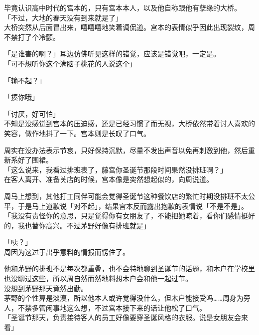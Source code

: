 毕竟认识高中时代的宫本的，只有宫本本人，以及他自称跟他有孽缘的大桥。\\

「不过，大地的春天没有到来就是了」\\

大桥突然从后面冒出来，嘻嘻嘻地笑着调侃道。宫本的表情似乎因此出现裂纹，周不禁打了个冷颤。

「是谁害的啊？」耳边仿佛听见这样的错觉，应该是错觉吧，一定是。\\

「可不想听你这个满脑子桃花的人说这个」

「输不起？」

「揍你哦」

「讨厌，好可怕」\\

不知是没感觉到宫本的压迫感，还是已经习惯了而无视，大桥依然带着讨人喜欢的笑容，做作地抖了一下。宫本则是长叹了口气。

周实在没办法表示节哀，只好保持沉默，尽量不发出声音以免再刺激到他，然后重新系好了围裙。\\

「这么说来，我看过排班表了，藤宫你圣诞节那段时间果然没排班啊？」\\

在客人离开、准备关店的时候，宫本像是突然想起似的，向周说道。

周马上想到，其他打工同伴可能会觉得圣诞节这种餐饮店的繁忙时期没排班不太公平，于是马上道歉说「对不起」，结果宫本反而露出抱歉的表情说「不是不是」。\\

「我没有责怪你的意思，只是觉得你有女朋友了，不能把她晾着，看你们感情挺好的，我也替你高兴。不过茅野好像有排班就是」

「咦？」\\

周因为这过于出乎意料的情报而愣住了。

他和茅野的排班不是每次都重叠，也不会特地聊到圣诞节的话题，和木户在学校里也没聊过这些，所以周自然而然地料想木户会和他一起过节。\\

没想到茅野那天竟然出勤。\\

茅野的个性算是淡漠，所以他本人或许觉得没什么，但木户能接受吗……周身为旁人，不禁多管闲事地这么想，不过宫本接下来的话让他松了口气。\\

「圣诞节那天，负责接待客人的员工好像要穿圣诞风格的衣服。说是女朋友会来看」

